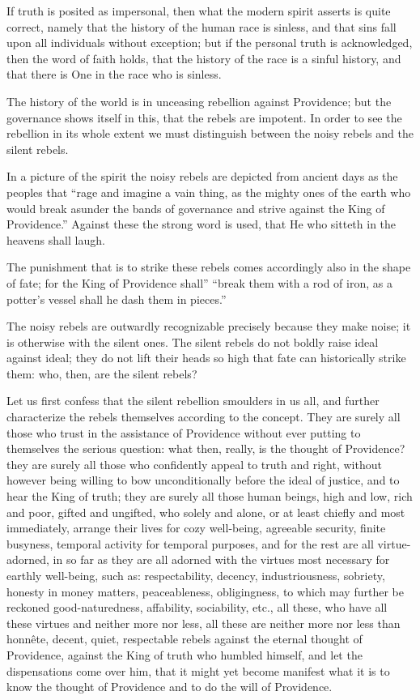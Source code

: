 \documentclass[12pt,a4paper,openany]{book}
\newcommand{\opage}[1]{\marginnote{\footnotesize\textit{[#1]}}}
\begin{document}
If truth is posited as impersonal, then what the modern spirit asserts
is quite correct, namely that the history of the human race is sinless,
and that sins fall upon all individuals
without exception; but if the personal
truth is acknowledged, then the word of faith holds, that
the history of the race is a sinful history, and that
there is One in the race who is sinless.

The history of the world is in unceasing rebellion against
Providence; but the governance shows itself in this, that
the rebels are impotent. In order to see the rebellion
in its whole extent we must distinguish between
the noisy rebels and the silent rebels.

In a picture of the spirit the noisy
rebels are depicted from ancient days as the peoples that ``rage
and imagine a vain thing, as the mighty ones of the earth
who would break asunder the bands of
governance and strive against the King of Providence.'' Against
these the strong word is used, that He who
sitteth in the heavens shall laugh.

The punishment that is to strike these rebels
\setcounter{footnote}{0}%
\opage{54}comes accordingly also in the shape of fate; for
the King of Providence shall'' ``break them with a rod of iron,
as a potter's vessel shall he dash them in
pieces.''

The noisy rebels are outwardly recognizable
precisely because they make noise; it is otherwise
with the silent ones. The silent rebels do not
boldly raise ideal against ideal; they do not lift
their heads so high that fate can historically
strike them: who, then, are the silent rebels?

Let us first confess that the silent rebellion smoulders
in us all, and further characterize the rebels
themselves according to the concept. They are surely all those who
trust in the assistance of Providence without ever
putting to themselves the serious question: what then, really, is the thought of Providence?
they are surely all those who confidently appeal to
truth and right, without however being willing to bow
unconditionally before the ideal of justice, and to hear
the King of truth; they are surely all those human beings,
high and low, rich and poor, gifted
and ungifted, who solely and alone, or at least chiefly
and most immediately, arrange their lives for
cozy well-being, agreeable security, finite
busyness, temporal activity for temporal
\setcounter{footnote}{0}%
\opage{55}purposes, and for the rest are all virtue-adorned, in so far as
they are all adorned with the virtues most necessary for
earthly well-being, such as:
respectability, decency, industriousness,
sobriety, honesty in money matters, peaceableness,
obligingness, to which may further be
reckoned good-naturedness, affability, sociability,
etc., all these, who have
all these virtues and neither more nor less, all
these are neither more nor less than honnête,
decent, quiet, respectable rebels against the eternal
thought of Providence, against the King of truth
who humbled himself, and let the dispensations
come over him, that it might yet become manifest
what it is to know the thought of Providence
and to do the will of Providence.
\end{document}

